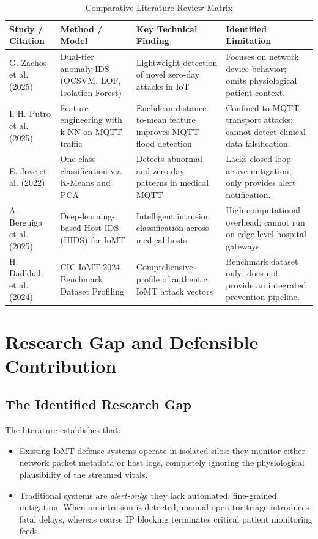 \documentclass[12pt,a4paper]{report}
\begin{document}
\begin{table}[h]
\centering
\caption{Comparative Literature Review Matrix}
\label{tab:lit_review}
\vspace{0.3cm}
\small
\begin{tabular}{|p{3.2cm}|p{3.2cm}|p{4.2cm}|p{4.2cm}|}
\hline
\textbf{Study / Citation} & \textbf{Method / Model} & \textbf{Key Technical Finding} & \textbf{Identified Limitation} \\
\hline
G. Zachos et al. (2025) \cite{zachos2025} & Dual-tier anomaly IDS (OCSVM, LOF, Isolation Forest) & Lightweight detection of novel zero-day attacks in IoT & Focuses on network device behavior; omits physiological patient context. \\
\hline
I. H. Putro et al. (2025) \cite{putro2025} & Feature engineering with k-NN on MQTT traffic & Euclidean distance-to-mean feature improves MQTT flood detection & Confined to MQTT transport attacks; cannot detect clinical data falsification. \\
\hline
E. Jove et al. (2022) \cite{jove2022} & One-class classification via K-Means and PCA & Detects abnormal and zero-day patterns in medical MQTT & Lacks closed-loop active mitigation; only provides alert notification. \\
\hline
A. Berguiga et al. (2025) \cite{berguiga2025} & Deep-learning-based Host IDS (HIDS) for IoMT & Intelligent intrusion classification across medical hosts & High computational overhead; cannot run on edge-level hospital gateways. \\
\hline
H. Dadkhah et al. (2024) \cite{dadkhah2024} & CIC-IoMT-2024 Benchmark Dataset Profiling & Comprehensive profile of authentic IoMT attack vectors & Benchmark dataset only; does not provide an integrated prevention pipeline. \\
\hline
\end{tabular}
\end{table}

\section{Research Gap and Defensible Contribution}
\subsection{The Identified Research Gap}
The literature establishes that:
\begin{itemize}
    \item Existing IoMT defense systems operate in isolated silos: they monitor either network packet metadata or host logs, completely ignoring the physiological plausibility of the streamed vitals.
    \item Traditional systems are \textit{alert-only}; they lack automated, fine-grained mitigation. When an intrusion is detected, manual operator triage introduces fatal delays, whereas coarse IP blocking terminates critical patient monitoring feeds.
\end{itemize}
\end{document}
